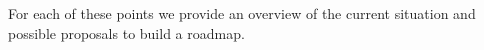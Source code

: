 \documentclass[12pt,a4paper]{article}
\begin{document}
For each of these points we provide an overview of the current situation and possible proposals to build a roadmap.

%


\sloppy
\raggedright
\clearpage
\printbibliography[title={References},heading=bibintoc]

\printbibliography[title={references}]
\end{document}
